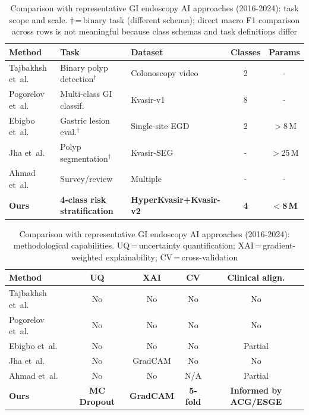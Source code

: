 \documentclass[11pt,a4paper]{article}
\begin{document}
\begin{table}[H]
\centering
\caption{Comparison with representative GI endoscopy AI approaches
  (2016-2024): task scope and scale. $\dag$\,=\,binary task (different
  schema); direct macro F1 comparison across rows is not meaningful because
  class schemas and task definitions differ}
\label{tab:sota_scope}
\begin{tabular}{lp{3.2cm}p{2.6cm}cc}
\toprule
\textbf{Method} & \textbf{Task} & \textbf{Dataset} &
\textbf{Classes} & \textbf{Params}\\
\midrule
Tajbakhsh et~al.~\citep{Tajbakhsh2016}
  & Binary polyp detection$^\dag$
  & Colonoscopy video & 2 & -\\
Pogorelov et~al.~\citep{Pogorelov2017}
  & Multi-class GI classif.
  & Kvasir-v1 & 8 & -\\
Ebigbo et~al.~\citep{Ebigbo2019}
  & Gastric lesion eval.$^\dag$
  & Single-site EGD & 2 & $>$8\,M\\
Jha et~al.~\citep{Jha2020}
  & Polyp segmentation$^\dag$
  & Kvasir-SEG & - & $>$25\,M\\
Ahmad et~al.~\citep{Ahmad2021}
  & Survey/review
  & Multiple & - & -\\
\midrule
\textbf{Ours}
  & \textbf{4-class risk stratification}
  & \textbf{HyperKvasir+Kvasir-v2} & \textbf{4} & \textbf{$<$8\,M}\\
\bottomrule
\end{tabular}
\end{table}

\begin{table}[H]
\centering
\caption{Comparison with representative GI endoscopy AI approaches
  (2016-2024): methodological capabilities. UQ\,=\,uncertainty
  quantification; XAI\,=\,gradient-weighted explainability;
  CV\,=\,cross-validation}
\label{tab:sota_capability}
\begin{tabular}{lcccc}
\toprule
\textbf{Method} & \textbf{UQ} & \textbf{XAI} &
\textbf{CV} & \textbf{Clinical align.}\\
\midrule
Tajbakhsh et~al.~\citep{Tajbakhsh2016}  & No & No & No & No\\
Pogorelov et~al.~\citep{Pogorelov2017} & No & No & No & No\\
Ebigbo et~al.~\citep{Ebigbo2019}        & No & No & No & Partial\\
Jha et~al.~\citep{Jha2020}              & No & GradCAM & No & No\\
Ahmad et~al.~\citep{Ahmad2021}          & No & No & N/A & Partial\\
\midrule
\textbf{Ours} & \textbf{MC Dropout} & \textbf{GradCAM}
  & \textbf{5-fold} & \textbf{Informed by ACG/ESGE}\\
\bottomrule
\end{tabular}
\end{table}
\end{document}
